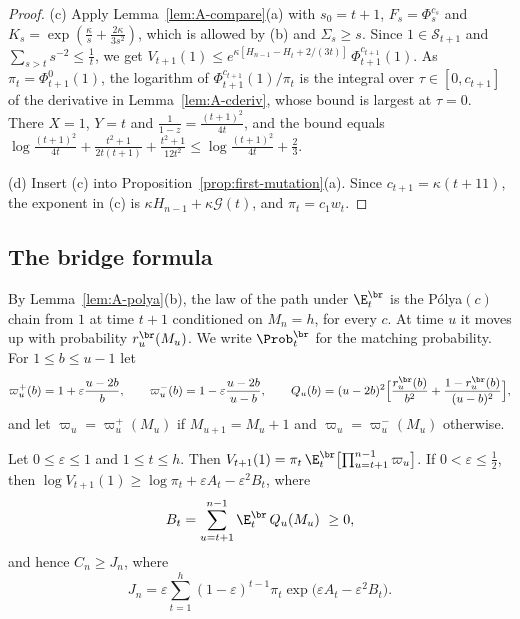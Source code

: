 \begin{proof}
(c) Apply Lemma~\ref{lem:A-compare}(a) with $s_0=t+1$, $F_s=\Phi^{c_s}_s$
and $K_s=\exp(\frac\kappa s+\frac{2\kappa}{3s^2})$, which is allowed by (b)
and $\Sigma_s\ge s$. Since $1\in\mathcal S_{t+1}$ and
$\sum_{s>t}s^{-2}\le\frac1t$, we get
$V_{t+1}(1)\le e^{\kappa[H_{n-1}-H_t+2/(3t)]}\,\Phi^{c_{t+1}}_{t+1}(1)$. As
$\pi_t=\Phi^0_{t+1}(1)$, the logarithm of $\Phi^{c_{t+1}}_{t+1}(1)/\pi_t$ is
the integral over $\tau\in[0,c_{t+1}]$ of the derivative in
Lemma~\ref{lem:A-cderiv}, whose bound is largest at $\tau=0$. There $X=1$,
$Y=t$ and $\frac1{1-z}=\frac{(t+1)^2}{4t}$, and the bound equals
$\log\frac{(t+1)^2}{4t}+\frac{t^2+1}{2t(t+1)}+\frac{t^2+1}{12t^2}
\le\log\frac{(t+1)^2}{4t}+\frac23$.

(d) Insert (c) into Proposition~\ref{prop:first-mutation}(a). Since
$c_{t+1}=\kappa(t+11)$, the exponent in (c) is
$\kappa H_{n-1}+\kappa\mathcal G(t)$, and $\pi_t=c_1w_t$.
\end{proof}

\subsection{The bridge formula}\label{app:erw-bridge}

By Lemma~\ref{lem:A-polya}(b), the law of the path under $\E^{\br}_t$ is
the P\'olya$(c)$ chain from $1$ at time $t+1$ conditioned on $M_n=h$, for
every $c$. At time $u$ it moves up with probability $r^{\br}_u(M_u)$. We
write $\Prob^{\br}_t$ for the matching probability. For $1\le b\le u-1$ let
\[
 \varpi^+_u(b)=1+\varepsilon\frac{u-2b}{b},\qquad
 \varpi^-_u(b)=1-\varepsilon\frac{u-2b}{u-b},\qquad
 Q_u(b)=(u-2b)^2\Bigl[\frac{r^{\br}_u(b)}{b^2}+\frac{1-r^{\br}_u(b)}{(u-b)^2}\Bigr],
\]
and let $\varpi_u=\varpi^+_u(M_u)$ if $M_{u+1}=M_u+1$ and
$\varpi_u=\varpi^-_u(M_u)$ otherwise.

\begin{proposition}\label{prop:A-bridge}
Let $0\le\varepsilon\le1$ and $1\le t\le h$. Then
$V_{t+1}(1)=\pi_t\,\E^{\br}_t\bigl[\prod_{u=t+1}^{n-1}\varpi_u\bigr]$. If
$0<\varepsilon\le\frac12$, then
$\log V_{t+1}(1)\ge\log\pi_t+\varepsilon A_t-\varepsilon^2B_t$, where
\begin{equation}\label{eq:A-Bt}
 B_t=\sum_{u=t+1}^{n-1}\E^{\br}_t\,Q_u(M_u)\ \ge0 ,
\end{equation}
and hence $C_n\ge J_n$, where
\begin{equation}\label{eq:A-Jn}
 J_n=\varepsilon\sum_{t=1}^h(1-\varepsilon)^{t-1}\pi_t
 \exp\bigl(\varepsilon A_t-\varepsilon^2B_t\bigr).
\end{equation}
\end{proposition}

